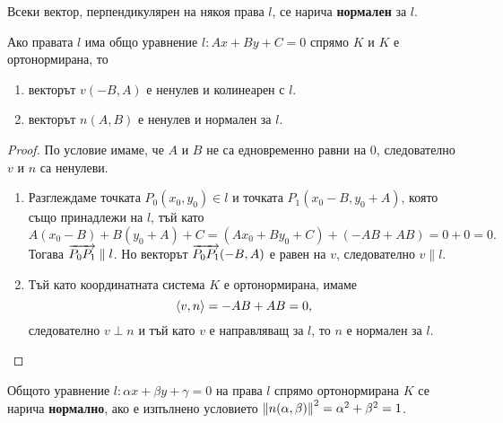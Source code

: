 \documentclass[numbers=endperiod, bibliography=totocnumbered]{scrartcl}
\begin{document}
\begin{definition}
  Всеки вектор, перпендикулярен на някоя права \( l \), се нарича \textbf{нормален} за \( l \).
\end{definition}

\begin{proposition}
  Ако правата \( l \) има общо уравнение \( l: Ax + By + C = 0 \) спрямо \( K \) и \( K \) е ортонормирана, то
  \begin{enumerate}
    \item векторът \( v(-B, A) \) е ненулев и колинеарен с \( l \).
    \item векторът \( n(A, B) \) е ненулев и нормален за \( l \).
  \end{enumerate}
\end{proposition}
\begin{proof}
  По условие имаме, че \( A \) и \( B \) не са едновременно равни на \( 0 \), следователно \( v \) и \( n \) са ненулеви.
  \begin{enumerate}
    \item Разглеждаме точката \( P_0(x_0, y_0) \in l \) и точката \( P_1(x_0 - B, y_0 + A) \), която също принадлежи на \( l \), тъй като
    \begin{equation*}
      A(x_0 - B) + B(y_0 + A) + C = (Ax_0 + By_0 + C) + (-AB + AB) = 0 + 0 = 0.
    \end{equation*}
     Тогава \( \overrightarrow{P_0 P_1} \parallel l \). Но векторът \( \overrightarrow{P_0 P_1}(-B, A) \) е равен на \( v \), следователно \( v \parallel l \).

    \item Тъй като координатната система \( K \) е ортонормирана, имаме
    \begin{equation*}
      \left\langle v, n \right\rangle = -AB + AB = 0,
    \end{equation*}
    следователно \( v \perp n \) и тъй като \( v \) е направляващ за \( l \), то \( n \) е нормален за \( l \).
  \end{enumerate}
\end{proof}

\begin{definition}
  Общото уравнение \( l: \alpha x + \beta y + \gamma = 0 \) на права \( l \) спрямо ортонормирана \( K \) се нарича \textbf{нормално}, ако е изпълнено условието \( \left\Vert n(\alpha, \beta) \right\Vert^2 = \alpha^2 + \beta^2 = 1 \).
\end{definition}
\end{document}
